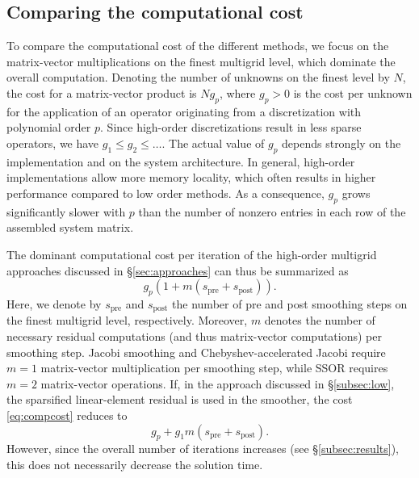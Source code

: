 \documentclass[smallcondensed,final]{svjour3}     %
\begin{document}
\subsection{Comparing the computational cost}\label{subsec:complexity}
To compare the computational cost of the different methods, we focus
on the matrix-vector multiplications on the finest multigrid level, which
dominate the overall computation. Denoting the number of unknowns on
the finest level by $N$, the cost for a matrix-vector product is
$Ng_p$, where $g_p>0$ is the cost per unknown for the application of
an operator originating from a discretization with polynomial order
$p$. Since high-order discretizations result in less sparse operators,
we have $g_1\le g_2\le \ldots$. The actual value of $g_p$ depends
strongly on the implementation and on the system architecture.
In general, high-order implementations allow more memory locality,
which often results in higher performance compared to low order
methods. As a consequence, $g_p$ grows significantly slower with $p$
than the number of nonzero entries in each row of the assembled system
matrix.

The dominant computational cost per iteration of the high-order
multigrid approaches discussed in \S\ref{sec:approaches} can
thus be summarized as
\begin{equation}\label{eq:compcost}
  g_p(1+m(s_\text{pre}+s_\text{post})).
\end{equation}
Here, we denote by $s_\text{pre}$ and $s_\text{post}$ the number of
pre and post smoothing steps on the finest multigrid level,
respectively. Moreover, $m$ denotes the number of necessary residual
computations (and thus matrix-vector computations) per smoothing step.
Jacobi smoothing and Chebyshev-accelerated Jacobi require $m=1$
matrix-vector multiplication per smoothing step, while SSOR requires
$m=2$ matrix-vector operations. If, in the approach discussed in
\S\ref{subsec:low}, the sparsified linear-element residual is used in the
smoother, the cost \eqref{eq:compcost} reduces to
\begin{equation}\label{eq:compcost2}
  g_p+g_1m(s_\text{pre}+s_\text{post}).
\end{equation}
However, since the overall number of iterations increases (see
\S\ref{subsec:results}), this does not necessarily decrease the
solution time.
\end{document}
